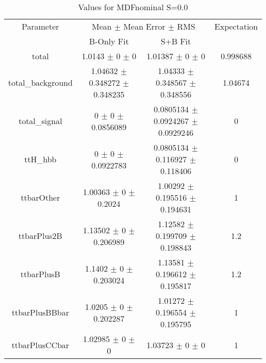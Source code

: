 \begin{table}
\centering
\caption{Values for MDFnominal S=0.0}
\begin{tabular}{cccc}
\toprule
Parameter & \multicolumn{2}{c}{Mean $\pm$ Mean Error $\pm$ RMS} & Expectation\\
 & B-Only Fit & S+B Fit & \\
\midrule
total & \num{1.0143} $\pm$ \num{0} $\pm$ \num{0} & \num{1.01387} $\pm$ \num{0} $\pm$ \num{0} & \num{0.998688}\\
total\_background & \num{1.04632} $\pm$ \num{0.348272} $\pm$ \num{0.348235} & \num{1.04333} $\pm$ \num{0.348567} $\pm$ \num{0.348556} & \num{1.04674}\\
total\_signal & \num{0} $\pm$ \num{0} $\pm$ \num{0.0856089} & \num{0.0805134} $\pm$ \num{0.0924267} $\pm$ \num{0.0929246} & \num{0}\\
ttH\_hbb & \num{0} $\pm$ \num{0} $\pm$ \num{0.0922783} & \num{0.0805134} $\pm$ \num{0.116927} $\pm$ \num{0.118406} & \num{0}\\
ttbarOther & \num{1.00363} $\pm$ \num{0} $\pm$ \num{0.2024} & \num{1.00292} $\pm$ \num{0.195516} $\pm$ \num{0.194631} & \num{1}\\
ttbarPlus2B & \num{1.13502} $\pm$ \num{0} $\pm$ \num{0.206989} & \num{1.12582} $\pm$ \num{0.199709} $\pm$ \num{0.198843} & \num{1.2}\\
ttbarPlusB & \num{1.1402} $\pm$ \num{0} $\pm$ \num{0.203024} & \num{1.13581} $\pm$ \num{0.196612} $\pm$ \num{0.195817} & \num{1.2}\\
ttbarPlusBBbar & \num{1.0205} $\pm$ \num{0} $\pm$ \num{0.202287} & \num{1.01272} $\pm$ \num{0.196554} $\pm$ \num{0.195795} & \num{1}\\
ttbarPlusCCbar & \num{1.02985} $\pm$ \num{0} $\pm$ \num{0} & \num{1.03723} $\pm$ \num{0} $\pm$ \num{0} & \num{1}\\
\bottomrule
\end{tabular}
\end{table}